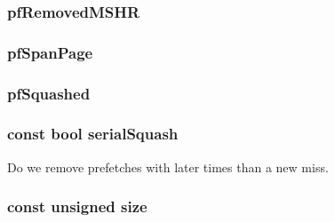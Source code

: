 \hypertarget{classBasePrefetcher_ac2aa69cf510d48d234493085b96d810b}{
\subsubsection[{pfRemovedMSHR}]{ {\bf pfRemovedMSHR}}}
\label{classBasePrefetcher_ac2aa69cf510d48d234493085b96d810b}
\hypertarget{classBasePrefetcher_a2e71998cfd3608b558c489b33280d0e6}{
\subsubsection[{pfSpanPage}]{ {\bf pfSpanPage}}}
\label{classBasePrefetcher_a2e71998cfd3608b558c489b33280d0e6}
\hypertarget{classBasePrefetcher_ae39544ad55ce96aa1560f3f3fc8f5906}{
\subsubsection[{pfSquashed}]{ {\bf pfSquashed}}}
\label{classBasePrefetcher_ae39544ad55ce96aa1560f3f3fc8f5906}
\hypertarget{classBasePrefetcher_a198469b16ef2d026a2ffa298eb77e616}{
\subsubsection[{serialSquash}]{\setlength{\rightskip}{0pt plus 5cm}const bool {\bf serialSquash}}}
\label{classBasePrefetcher_a198469b16ef2d026a2ffa298eb77e616}
Do we remove prefetches with later times than a new miss. \hypertarget{classBasePrefetcher_ad3f1cf0299fe68eb9a68a7c67232c62d}{
\subsubsection[{size}]{\setlength{\rightskip}{0pt plus 5cm}const unsigned {\bf size}}}
